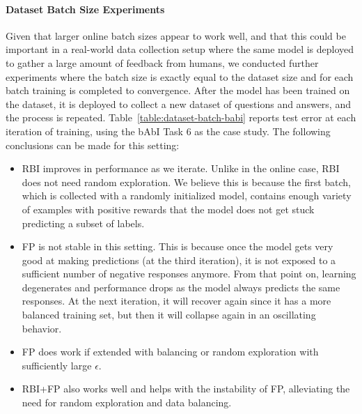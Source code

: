 \paragraph{Dataset Batch Size Experiments}
Given that larger online batch sizes appear to work well, and that this could be important in
a real-world data collection setup where the same model is deployed to gather a large amount
 of feedback from humans,
we conducted further experiments where the batch size is exactly equal to the dataset size
 and for each batch training is completed to convergence.
After the model has been trained on the dataset,
it is deployed to collect a new dataset of questions and answers, and the process is repeated.
Table~\ref{table:dataset-batch-babi} reports test error at each iteration of training,
using the bAbI Task $6$ as the case study.
The following conclusions can be made for this setting:
\begin{itemize}
\item RBI improves in performance as we iterate. Unlike in the online case,
RBI does not need random exploration.
We believe this is because the first batch, which is collected with a randomly initialized model,
contains enough variety of examples with positive rewards
 that the model does not get stuck predicting a subset of labels.
\item FP is not stable in this setting. %
This is because once the model gets very good
at making predictions (at the third iteration), it is not exposed to a sufficient number of
negative responses anymore.
From that point on, learning degenerates and performance drops as the model always predicts the same responses.
At the next iteration, it will recover again since it has a more balanced training set,
but then it will collapse again in an oscillating behavior.
\item FP does work if extended with balancing or random exploration with sufficiently large $\epsilon$.
\item RBI+FP also works well and helps with the instability of FP, alleviating the need for random exploration and data balancing.
\end{itemize}

